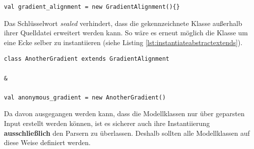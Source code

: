 \begin{lstlisting}[style=scala, caption = {Beispiel zur Instantiierung der abstrakten Klasse GradientAlignment}, label = {lst:instantiateabstract}]
val gradient_alignment = new GradientAlignment(){}
\end{lstlisting}
Das Schlüsselwort \textit{sealed} verhindert, dass die gekennzeichnete Klasse außerhalb ihrer Quelldatei erweitert werden kann. So wäre es erneut möglich die Klasse um eine Ecke selber zu instantiieren (siehe Listing \ref{lst:instantiateabstractextends}).
\begin{lstlisting}[style=scala, caption = {Beispiel zur Instantiierung der abstrakten Klasse GradientAlignment über Vererbung}, label = {lst:instantiateabstractextends}]
class AnotherGradient extends GradientAlignment

& 
 
val anonymous_gradient = new AnotherGradient()
\end{lstlisting}
Da davon ausgegangen werden kann, dass die Modellklassen nur über geparsten Input erstellt werden können, ist es sicherer auch ihre Instantiierung \textbf{ausschließlich} den Parsern zu überlassen. Deshalb sollten alle Modellklassen auf diese Weise definiert werden.

